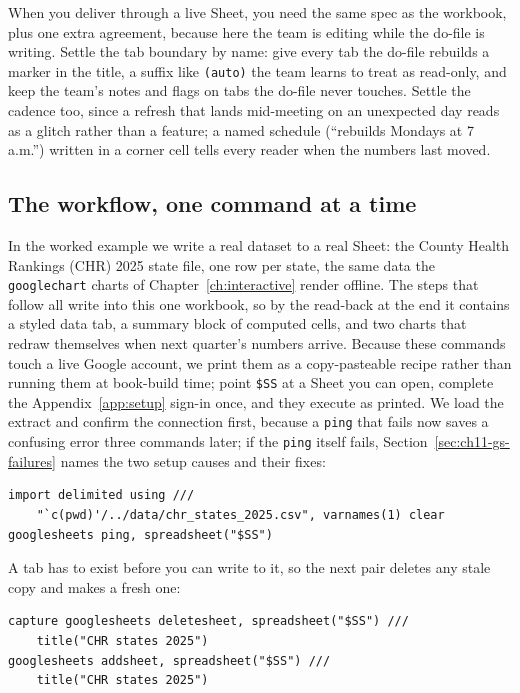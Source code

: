 \documentclass[
    a4paper,
    fontsize=10pt,
    twoside=true,
    numbers=noenddot,
]{kaobook}
\begin{document}
When you deliver through a live Sheet, you need the same spec as the workbook, plus one extra agreement, because here the team is editing while the do-file is writing. Settle the tab boundary by name: give every tab the do-file rebuilds a marker in the title, a suffix like \texttt{(auto)} the team learns to treat as read-only, and keep the team's notes and flags on tabs the do-file never touches. Settle the cadence too, since a refresh that lands mid-meeting on an unexpected day reads as a glitch rather than a feature; a named schedule (\enquote{rebuilds Mondays at 7 a.m.}) written in a corner cell tells every reader when the numbers last moved.

\subsection{The workflow, one command at a time}
In the worked example we write a real dataset to a real Sheet: the County Health Rankings (CHR) 2025 state file, one row per state, the same data the \texttt{googlechart} charts of Chapter~\ref{ch:interactive} render offline. The steps that follow all write into this one workbook, so by the read-back at the end it contains a styled data tab, a summary block of computed cells, and two charts that redraw themselves when next quarter's numbers arrive. Because these commands touch a live Google account, we print them as a copy-pasteable recipe rather than running them at book-build time; point \texttt{\$SS} at a Sheet you can open, complete the Appendix~\ref{app:setup} sign-in once, and they execute as printed. We load the extract and confirm the connection first, because a \texttt{ping} that fails now saves a confusing error three commands later; if the \texttt{ping} itself fails, Section~\ref{sec:ch11-gs-failures} names the two setup causes and their fixes:
\par
{\footnotesize
\begin{verbatim}
import delimited using ///
    "`c(pwd)'/../data/chr_states_2025.csv", varnames(1) clear
googlesheets ping, spreadsheet("$SS")
\end{verbatim}
}
A tab has to exist before you can write to it, so the next pair deletes any stale copy and makes a fresh one:
\par
{\footnotesize
\begin{verbatim}
capture googlesheets deletesheet, spreadsheet("$SS") ///
    title("CHR states 2025")
googlesheets addsheet, spreadsheet("$SS") ///
    title("CHR states 2025")
\end{verbatim}
}
\end{document}
